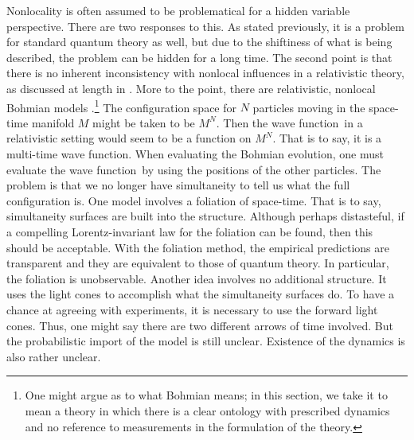 \documentclass[11pt]{article}
\theoremstyle{remark}
\begin{document}
Nonlocality is often assumed to be problematical for a hidden variable
perspective. There are two responses to this. As stated previously, it is a
problem for standard quantum theory as well, but due to the shiftiness
of what is being described, the problem can be hidden for a long
time. The second point is that there is no inherent inconsistency with
nonlocal influences in a relativistic theory, as discussed at length
in \cite{M94}. More to the point, there are relativistic,
nonlocal Bohmian models \cite{BDGZ99, GTu03}.\footnote{One might
  argue as to what Bohmian means; in this section, we take it to mean
  a theory in which there is a clear ontology with prescribed dynamics
  and no reference to measurements in the formulation of the theory.}
The configuration space for $N$ particles moving in the space-time
manifold $M$ might
be taken to be $M^N$. Then  
the wave function\ in a relativistic setting
would seem to be a function on $M^N$. That
is to say, it is a  multi-time wave function. When
evaluating the Bohmian evolution, one must evaluate the wave function\ by using
the 
positions of the other particles. The problem is that we no longer
have simultaneity to tell us what the full configuration is. 
One model involves a foliation of space-time. That is to say,
simultaneity surfaces are built into the structure. Although perhaps
distasteful, if a compelling Lorentz-invariant 
law for the foliation can be found, then this should be
acceptable. With the foliation method, the empirical predictions are
transparent and they are equivalent to those of quantum theory. In
particular, the foliation is unobservable. Another idea involves no
additional structure. It uses the light cones to accomplish what the
simultaneity surfaces do. To have a chance at agreeing with
experiments, it is necessary to use the forward light cones. Thus, one
might say there are two different arrows of time involved. But 
the probabilistic import of the model is still unclear. Existence of
the dynamics is also rather unclear.
\end{document}
